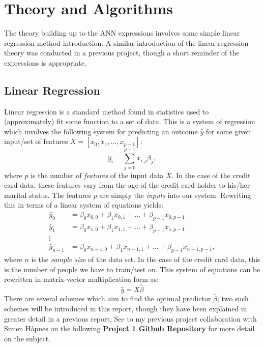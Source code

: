 \section{Theory and Algorithms}
    The theory building up to the ANN expressions involves some simple linear regression method introduction. A similar introduction of the linear regression theory was conducted in a previous project, though a short reminder of the expressions is appropriate.
    \subsection{Linear Regression}
        Linear regression is a standard method found in statistics used to (approximately) fit some function to a set of data. This is a system of regression which involves the following system for predicting an outcome $\hat{y}$ for some given input/set of features $X=[x_0, x_1, \hdots,  x_{p-1}]$:
        \begin{equation}
            \hat{y}_i = \sum^{p-1}_{j=0} x_{i,j}\beta_j, 
        \end{equation}
        where $p$ is the number of \textit{features} of the input data $X$. In the case of the credit card data, these features vary from the age of the credit card holder to his/her marital status. The features $p$ are simply the \textit{inputs} into our system. Rewriting this in terms of a linear system of equations yields:
        \begin{align*}
            \hat{y}_0 &= \beta_0x_{0,0} + \beta_1x_{0,1} + \hdots +\beta_{p-1}x_{0,p-1}\\
            \hat{y}_1 &= \beta_0x_{1,0} + \beta_1x_{1,1} + \hdots +\beta_{p-1}x_{1,p-1}\\
            \vdots\\
            \hat{y}_{n-1} &= \beta_0x_{n-1,0} + \beta_1x_{n-1,1} + \hdots + \beta_{p-1}x_{n-1,p-1},
        \end{align*}
        where $n$ is the \textit{sample size} of the data set. In the case of the credit card data, this is the number of people we have to train/test on. This system of equations can be rewritten in matrix-vector multiplication form as:
        \begin{equation}
            \hat{y} = X\hat{\beta}
        \end{equation}
        There are several schemes which aim to find the optimal predictor $\hat{\beta}$; two such schemes will be introduced in this report, though they have been explained in greater detail in a previous report. See to my previous project collaboration with Simen Håpnes on the following  \href{https://github.com/steinnhauser/Neural-Networks/tree/master/FYS-STK4155/Project1}{\textbf{Project 1 Github Repository}} for more detail on the subject.

